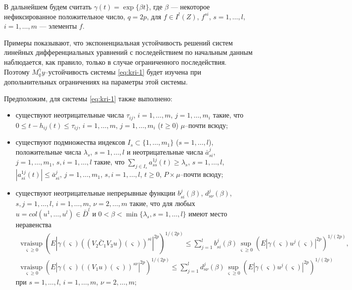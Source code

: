 В дальнейшем будем считать $\gamma (t) = \exp \{\beta t\}$, где
$\beta$ --- некоторое  нефиксированное положительное число, $q =
2p$, для  $f \in I^l(Z)$,
 $f^{si}$, $s = 1,\dots,l$, $i = 1,\dots,m$ --- элементы $f$.

Примеры показывают, что экспоненциальная устойчивость решений систем
линейных дифференциальных уравнений с последействием по начальным
данным наблюдается, как правило, только в случае ограниченного
последействия. Поэтому $M_q^\gamma y$--устойчивость системы \eqref{eq:kri-1}
будет изучена при допольнительных ограничениях  на параметры этой
системы.

Предположим, для системы \eqref{eq:kri-1} также выполнено:
\begin{itemize}
    \item существуют неотрицательные числа $\tau_{ij}$, $i = 1,\dots,m$, $j =
    1,\dots,m_i$ такие, что $0 \leq
     t- h_{ij}(t) \leq \tau _{ij}$, $i = 1,\dots,m$, $j = 1,\dots,m_i$ ($t
     \geq 0$) $\mu $--почти всюду;
    
    \item  существуют подмножества индексов $I_s \subset \{1,\dots, m_1\}$ ($s
    = 1,\dots, l$), положительные числа  $ \lambda _s$, $s = 1, \dots, l$ и
    неотрицательные числа $\bar a_{si}^j$, $j = 1, \dots, m_1$, $s,i = 1,
     \dots, l$ такие, что $\sum \limits_{j\in I_s}a^{1j}_{ss}(t) \geq
     \lambda _s$, $s = 1,\dots,l$, $|a^{1j}_{si}(t)|\leq \bar a^j_{si}$, $j =
     1,\dots,m_1$, $s,i = 1, \dots, l$, $t \geq 0$, $P\times\mu$--почти
    всюду;
    
    \item  существуют неотрицательные непрерывные функции $b_{si}^j(\beta)$,
    $d_{s\nu}^j(\beta)$, $s, j = 1, \dots, l$, $i = 1, \dots, m$, $\nu = 2,
    \dots, m$ такие, что для любых $u = col (u^1, \dots, u^l) \in \bar D^l$
    и $0<\beta < \min \{\lambda _s, s = 1, \dots, l \}$ имеют  место
    неравенства
     \begin{gather*}
      \mathrel {\mathop
     {vrai \sup} \limits _{\varsigma \geq 0}} \left(E\left |\gamma
    (\varsigma)((V_2\bar C_1V_3 u)(\varsigma ))^{si}\right |^{2p}\right)^{1/(2p)} \leq \sum \limits_{j=1}^lb_{si}^j(\beta)\sup \limits
    _{\varsigma \geq 0}\left (E\left |\gamma
    (\varsigma)u^j(\varsigma)\right |^{2p}\right )^{1/(2p)},\\
    \mathrel {\mathop
     {vrai \sup}\limits _{\varsigma \geq 0}} \left(E\left |\gamma
    (\varsigma)((V_1 u)(\varsigma ))^{s\nu}\right |^{2p}\right)^{1/(2p)} \leq \sum \limits_{j=1}^ld_{s\nu}^j(\beta)\sup \limits
    _{\varsigma \geq 0}\left (E\left |\gamma
    (\varsigma)u^j(\varsigma)\right |^{2p}\right )^{1/(2p)}
    \end{gather*} при $s = 1,\dots,l$, $i = 1, \dots, m $, $\nu = 2, \dots, m$;
    

\end{itemize}
